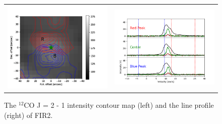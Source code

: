 \begin{figure}[h!]
	\begin{center}
		\begin{tabular}{cc}
			\includegraphics[width=7cm]{Orion_12CO2-1_FIR2_rbcontour_400_modified} &   \includegraphics[width=7cm]{Orion_12CO2-1_FIR2_line_profile_400}
		\end{tabular}
		\caption{The $^{12}$CO J = 2 - 1 intensity contour map (left) and the line profile (right) of FIR2.}	
	\label{fig:FIR221}
	\end{center}
\end{figure}

